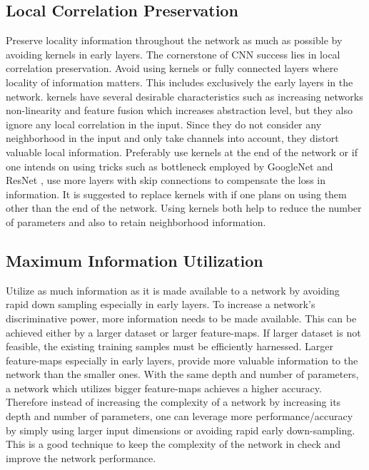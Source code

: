 \documentclass{article} \usepackage{lets_keepit_simple,times}
\begin{document}
\subsection{Local Correlation Preservation}
Preserve locality information throughout the network as much as possible by avoiding  kernels in early layers. The cornerstone of CNN success lies in local correlation preservation. Avoid using  kernels or fully connected layers where locality of information matters. This includes exclusively the early layers in the network.  kernels have several desirable characteristics such as increasing networks non-linearity and feature fusion \cite{Lin_NIN_2013} which increases abstraction level, but they also ignore any local correlation in the input. Since they do not consider any neighborhood in the input and only take channels into account, they distort valuable local information. Preferably use  kernels at the end of the network or if one intends on using tricks such as bottleneck employed by GoogleNet \cite{Szegedy_googlenet_2015} and ResNet \cite{He_ResNet_2015}, use more layers with skip connections to compensate the loss in information. It is suggested to replace  kernels with  if one plans on using them other than the end of the network. Using  kernels both help to reduce the number of parameters and also to retain neighborhood information. 
\subsection{Maximum Information Utilization}
Utilize as much information as it is made available to a network by avoiding rapid down sampling especially in early layers. To increase a network's discriminative power, more information needs to be made available. This can be achieved either by a larger dataset or larger feature-maps. If larger dataset is not feasible, the existing training samples must be efficiently harnessed. Larger feature-maps especially in early layers, provide more valuable information to the network than the smaller ones. With the same depth and number of parameters, a network which utilizes bigger feature-maps achieves a higher accuracy. Therefore instead of increasing the complexity of a network by increasing its depth and number of parameters, one can leverage more performance/accuracy by simply using larger input dimensions or avoiding rapid early down-sampling. This is a good technique to keep the complexity of the network in check and improve the network performance. 
\end{document}
